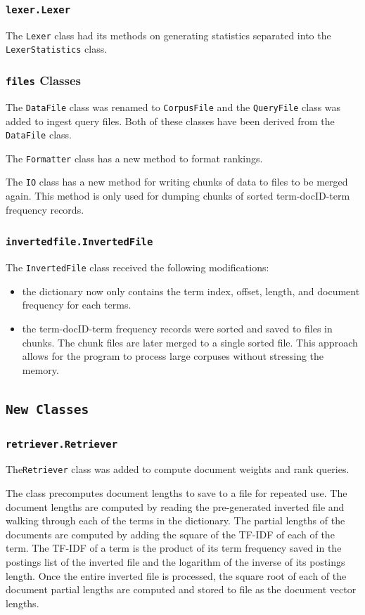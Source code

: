\documentclass[11pt]{article}
\begin{document}
\subsubsection{\texttt{lexer.Lexer}}
The \texttt{Lexer} class had its methods on generating statistics separated into the \texttt{LexerStatistics} class.

\subsubsection{\texttt{files} Classes}
The \texttt{DataFile} class was renamed to \texttt{CorpusFile} and the \texttt{QueryFile} class was added to ingest query files. Both of these classes have been derived from the \texttt{DataFile} class.

The \texttt{Formatter} class has a new method to format rankings.

The \texttt{IO} class has a new method for writing chunks of data to files to be merged again. This method is only used for dumping chunks of sorted term-docID-term frequency records.

\subsubsection{\texttt{invertedfile.InvertedFile}}
The \texttt{InvertedFile} class received the following modifications:
\begin{itemize}
    \item the dictionary now only contains the term index, offset, length, and document frequency for each terms.
    \item the term-docID-term frequency records were sorted and saved to files in chunks. The chunk files are later merged to a single sorted file. This approach allows for the program to process  large corpuses without stressing the memory.
\end{itemize}

\subsection{\texttt{New Classes}}

\subsubsection{\texttt{retriever.Retriever}}
The\texttt{Retriever} class was added to compute document weights and rank queries.

The class precomputes document lengths to save to a file for repeated use. The document lengths are computed by reading the pre-generated inverted file and walking through each of the terms in the dictionary. The partial lengths of the documents are computed by adding the square of the TF-IDF of each of the term. The TF-IDF of a term is the product of its term frequency saved in the postings list of the inverted file and the logarithm of the inverse of its postings length. Once the entire inverted file is processed, the square root of each of the document partial lengths are computed and stored to file as the document vector lengths.
\end{document}
